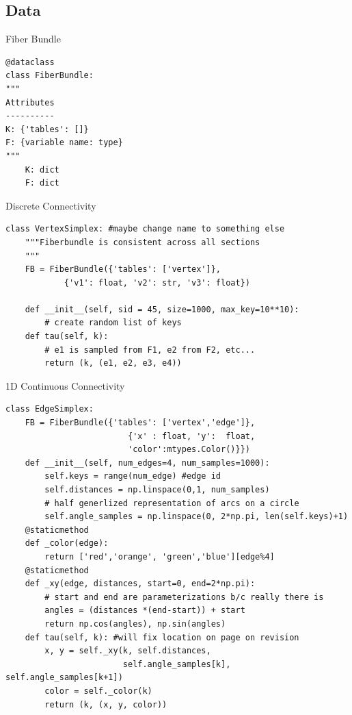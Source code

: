 \documentclass[xcolor={dvipsnames}, handout]{beamer}
\begin{document}
\subsection{Data}
\begin{frame}[fragile]{Fiber Bundle}
\begin{verbatim}
@dataclass
class FiberBundle:
"""
Attributes
----------
K: {'tables': []}
F: {variable name: type}
"""
    K: dict 
    F: dict
\end{verbatim}
\end{frame}

\begin{frame}[fragile]{Discrete Connectivity}
\begin{verbatim}
class VertexSimplex: #maybe change name to something else
    """Fiberbundle is consistent across all sections
    """
    FB = FiberBundle({'tables': ['vertex']},  
            {'v1': float, 'v2': str, 'v3': float})

    def __init__(self, sid = 45, size=1000, max_key=10**10):
        # create random list of keys
    def tau(self, k):
        # e1 is sampled from F1, e2 from F2, etc...
        return (k, (e1, e2, e3, e4))
\end{verbatim}
\end{frame}

\begin{frame}[fragile]{1D Continuous Connectivity}
\begin{verbatim}
class EdgeSimplex: 
    FB = FiberBundle({'tables': ['vertex','edge']},
                         {'x' : float, 'y':  float, 
                         'color':mtypes.Color()}})
    def __init__(self, num_edges=4, num_samples=1000): 
        self.keys = range(num_edge) #edge id
        self.distances = np.linspace(0,1, num_samples)
        # half generlized representation of arcs on a circle
        self.angle_samples = np.linspace(0, 2*np.pi, len(self.keys)+1)
    @staticmethod
    def _color(edge):
        return ['red','orange', 'green','blue'][edge%4]
    @staticmethod
    def _xy(edge, distances, start=0, end=2*np.pi):
        # start and end are parameterizations b/c really there is 
        angles = (distances *(end-start)) + start
        return np.cos(angles), np.sin(angles)
    def tau(self, k): #will fix location on page on revision
        x, y = self._xy(k, self.distances, 
                        self.angle_samples[k], self.angle_samples[k+1]) 
        color = self._color(k) 
        return (k, (x, y, color))
\end{verbatim}
\end{frame}
\end{document}
